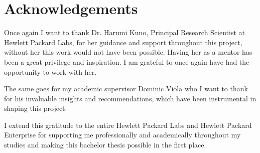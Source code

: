 \chapter*{Acknowledgements}
\label{Acknowledgements}


Once again I want to thank Dr. Harumi Kuno, Principal Research Scientist at Hewlett Packard Labs,
for her guidance and support throughout this project, without her this work would not have been possible.
Having her as a mentor has been a great privilege and inspiration.
I am grateful to once again have had the opportunity to work with her. \

The same goes for my academic supervisor Dominic Viola who I want to thank
for his invaluable insights and recommendations, which have been instrumental in shaping this project. \

I extend this gratitude to the entire Hewlett Packard Labs and Hewlett Packard Enterprise
for supporting me professionally and academically throughout my studies
and making this bachelor thesis possible in the first place.
